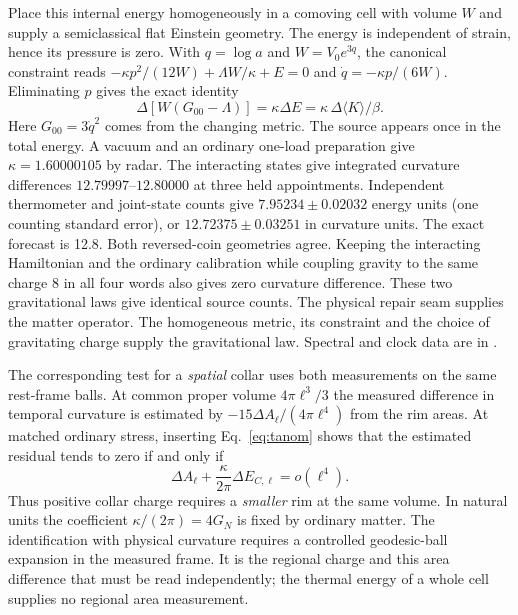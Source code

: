 \documentclass[11pt]{article}
\begin{document}
Place this internal energy homogeneously in a comoving cell with
volume $W$ and supply a semiclassical flat Einstein geometry. The
energy is independent of strain, hence its pressure is zero.
With $q=\log a$ and $W=V_0e^{3q}$, the canonical constraint reads
$-\kappa p^2/(12W)+\Lambda W/\kappa+E=0$ and
$\dot q=-\kappa p/(6W)$. Eliminating $p$ gives the exact identity
\[
 \Delta[W(G_{00}-\Lambda)]
   =\kappa\Delta E=\kappa\,\Delta\langle K\rangle/\beta .
\]
Here $G_{00}=3\dot q^2$ comes from the changing metric. The source
appears once in the total energy. A vacuum and an ordinary one-load
preparation give $\kappa=1.60000105$ by radar. The interacting states
give integrated curvature differences $12.79997$--$12.80000$ at three
held appointments. Independent thermometer and joint-state counts give
$7.95234\pm0.02032$ energy units (one counting standard error), or
$12.72375\pm0.03251$ in curvature units. The exact forecast is 12.8.
Both reversed-coin geometries agree. Keeping the interacting
Hamiltonian and the ordinary calibration while coupling gravity to the
same charge 8 in all four words also gives zero curvature difference.
These two gravitational laws give identical source counts.
The physical repair seam supplies the matter operator. The homogeneous
metric, its constraint and the choice of gravitating charge supply the
gravitational law. Spectral and clock data are in
.

The corresponding test for a \emph{spatial} collar uses both
measurements on the same rest-frame balls. At common proper
volume $4\pi\ell^3/3$ the measured difference in temporal curvature is
estimated by $-15\Delta A_\ell/(4\pi\ell^4)$ from the rim areas.
At matched ordinary stress, inserting Eq.~\eqref{eq:tanom} shows that
the estimated residual tends to zero if and only if
\[
 \Delta A_\ell+\frac{\kappa}{2\pi}\Delta E_{C,\ell}=o(\ell^4).
\]
Thus positive collar charge requires a \emph{smaller} rim at the same
volume. In natural units the coefficient $\kappa/(2\pi)=4G_N$ is
fixed by ordinary matter. The identification with physical curvature
requires a controlled geodesic-ball expansion in the measured frame.
It is the regional charge and this area difference that must be read
independently; the thermal energy of a whole cell supplies no regional
area measurement.
\end{document}
